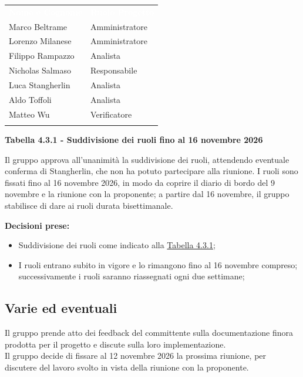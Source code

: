 \documentclass[12pt,a4paper]{article}
\newcommand{\tightlist}{\setlength{\itemsep}{1pt}\setlength{\parskip}{0pt}}
\begin{document}
\hypertarget{tab-4.3.1}{
\begin{center}
\begin{tabularx}{\linewidth}{>{\raggedright\arraybackslash}X>{\raggedright\arraybackslash}X}
\rowcolor{bfblue}\textcolor{white}{\textbf{Nome e Cognome}} & \textcolor{white}{\textbf{Ruolo Progetto}}\\
Marco Beltrame & Amministratore \\ \arrayrulecolor{bfline}\hline
Lorenzo Milanese & Amministratore \\ \arrayrulecolor{bfline}\hline
Filippo Rampazzo & Analista \\ \arrayrulecolor{bfline}\hline
Nicholas Salmaso & Responsabile \\ \arrayrulecolor{bfline}\hline
Luca Stangherlin & Analista \\ \arrayrulecolor{bfline}\hline
Aldo Toffoli & Analista \\ \arrayrulecolor{bfline}\hline
Matteo Wu & Verificatore \\ \arrayrulecolor{bfline}\hline
\end{tabularx}
\textbf{Tabella 4.3.1 - Suddivisione dei ruoli fino al 16 novembre 2026}
\end{center}
}

Il gruppo approva all'unanimità la suddivisione dei ruoli, attendendo eventuale conferma di Stangherlin, che non ha potuto partecipare alla riunione.
I ruoli sono fissati fino al 16 novembre 2026, in modo da coprire il diario di bordo del 9 novembre e la riunione con la proponente;
a partire dal 16 novembre, il gruppo stabilisce di dare ai ruoli durata bisettimanale.

\textbf{Decisioni prese:}
\begin{itemize}
\tightlist
\item[$\checkmark$] Suddivisione dei ruoli come indicato alla \hyperlink{tab-4.3.1}{Tabella 4.3.1};
\item[$\checkmark$] I ruoli entrano subito in vigore e lo rimangono fino al 16 novembre compreso; successivamente i ruoli saranno riassegnati ogni due settimane;
\end{itemize}

\hypertarget{varie-ed-eventuali}{%
\subsection{Varie ed eventuali}}
Il gruppo prende atto dei feedback del committente sulla documentazione finora prodotta per il progetto e discute sulla loro implementazione. \\
Il gruppo decide di fissare al 12 novembre 2026 la prossima riunione, per discutere del lavoro svolto in vista della riunione con la proponente.
\newpage
\end{document}
